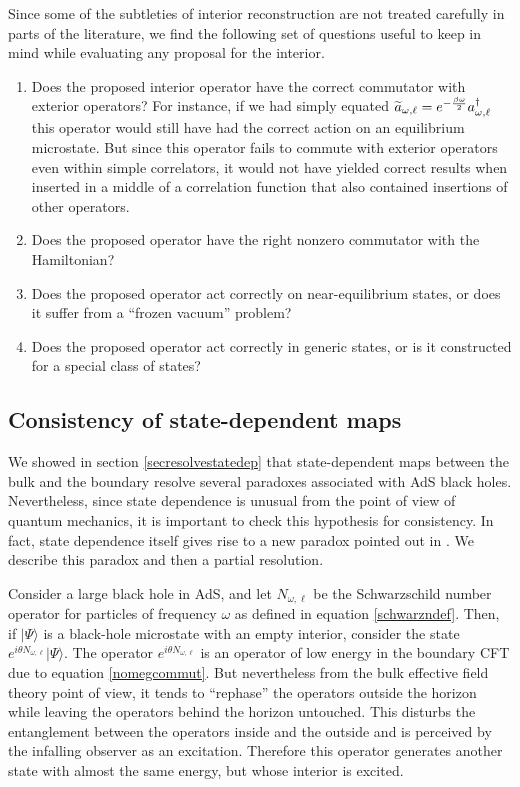 \documentclass[12pt]{article}
\def\schwarzn{N}
\newcommand{\cop}[1]{#1}
\def\ta{\widetilde{\cop{a}}}
\begin{document}
Since some of the subtleties of interior reconstruction are not treated carefully in parts of the literature, we find the following set of questions useful to keep in mind while evaluating any proposal for the interior.
\begin{enumerate}
\item
Does the proposed interior operator have the correct commutator with exterior operators? For instance, if  we had simply equated $\ta_{\omega, \ell} = e^{-{\beta \omega \over 2}} a_{\omega, \ell}^{\dagger}$ this operator would still have had the correct action on an equilibrium microstate. But since this operator fails to commute with exterior operators even within simple correlators, it would not have yielded correct results when inserted in a middle of a correlation function that also contained insertions of other operators.
\item
Does the proposed operator have the right nonzero commutator with the Hamiltonian?
\item
Does the proposed operator act correctly on near-equilibrium states, or does it suffer from a ``frozen vacuum'' problem?
\item
Does the proposed operator act correctly in generic states, or is it constructed for a special class of states?
\end{enumerate}










\subsection{Consistency of  state-dependent maps \label{mpparadox}}
We showed in section \ref{secresolvestatedep} that state-dependent maps between the bulk and the boundary resolve several paradoxes associated with AdS black holes. Nevertheless, since state dependence is unusual from the point of view of quantum mechanics, it is important to check this hypothesis for consistency. In fact, state dependence itself gives rise to a new paradox pointed out in  \cite{Marolf:2015dia}. We describe this paradox and then a partial resolution.



Consider a large black hole in AdS, and let $\schwarzn_{\omega, \ell}$  be the Schwarzschild number operator for particles of frequency $\omega$ as defined in equation \eqref{schwarzndef}.  Then, if $|\Psi \rangle$ is a black-hole microstate with an empty interior,  consider the state $e^{i \theta \schwarzn_{\omega, \ell}} |\Psi \rangle$. The operator $e^{i \theta \schwarzn_{\omega, \ell}}$ is an operator of low energy in the boundary CFT due to equation \eqref{nomegcommut}.  But nevertheless from the bulk effective field theory point of view, it tends to ``rephase'' the operators outside the horizon while leaving the operators behind the horizon untouched. This disturbs the entanglement between the operators inside and the outside and is perceived by the infalling observer as an excitation. Therefore this operator generates another state with almost the same energy, but whose interior is excited. 
\end{document}

